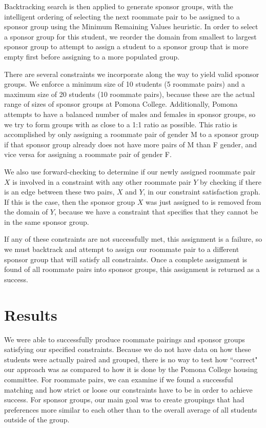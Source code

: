 \documentclass[letterpaper]{article}
\begin{document}
Backtracking search is then applied to generate sponsor groups, with the intelligent ordering of selecting the next roommate pair to be assigned to a sponsor group using the Minimum Remaining Values heuristic. In order to select a sponsor group for this student, we reorder the domain from smallest to largest sponsor group to attempt to assign a student to a sponsor group that is more empty first before assigning to a more populated group.

There are several constraints we incorporate along the way to yield valid sponsor groups. We enforce a minimum size of 10 students (5 roommate pairs) and a maximum size of 20 students (10 roommate pairs), because these are the actual range of sizes of sponsor groups at Pomona College. Additionally, Pomona attempts to have a balanced number of males and females in sponsor groups, so we try to form groups with as close to a 1:1 ratio as possible. This ratio is accomplished by only assigning a roommate pair of gender M to a sponsor group if that sponsor group already does not have more pairs of M than F gender, and vice versa for assigning a roommate pair of gender F. 

We also use forward-checking to determine if our newly assigned roommate pair $X$ is involved in a constraint with any other roommate pair $Y$ by checking if there is an edge between these two pairs, $X$ and $Y$, in our constraint satisfaction graph. If this is the case, then the sponsor group $X$ was just assigned to is removed from the domain of $Y$, because we have a constraint that specifies that they cannot be in the same sponsor group.

If any of these constraints are not successfully met, this assignment is a failure, so we must backtrack and attempt to assign our roommate pair  to a different sponsor group that will satisfy all constraints. Once a complete assignment is found of all roommate pairs into sponsor groups, this assignment is returned as a success.


\section{Results}
We were able to successfully produce roommate pairings and sponsor groups satisfying our specified constraints. Because we do not have data on how these students were actually paired and grouped, there is no way to test how ``correct" our approach was as compared to how it is done by the Pomona College housing committee. For roommate pairs, we can examine if we found a successful matching and how strict or loose our constraints have to be in order to achieve success. For sponsor groups, our main goal was to create groupings that had preferences more similar to each other than to the overall average of all students outside of the group.  
\end{document}

